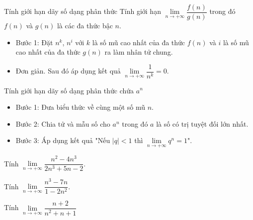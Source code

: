 \begin{dang}{Tính giới hạn dãy số dạng phân thức}
	Tính giới hạn	$\lim \limits_{n \to +\infty}\dfrac{f\left(n\right)}{g\left(n\right)}$ trong đó $f\left(n\right)$ và $g\left(n\right)$ là các đa thức bậc $n$.\\
	\begin{itemize}
		\item Bước 1: Đặt $n^k$, $n^i$  với $k$ là số mũ cao nhất của đa thức $f\left(n\right)$ và $i$ là số mũ cao nhất của đa thức $g\left(n\right)$ ra làm nhân tử chung.
		\item Đơn giản. Sau đó áp dụng kết quả 	$\lim \limits_{n \to +\infty}\dfrac{1}{n^k}=0$.
	\end{itemize}
\end{dang}
\begin{dang}{Tính giới hạn dãy số dạng phân thức chứa $a^n$}
	\begin{itemize}
		\item Bước 1: Đưa biểu thức về cùng một số mũ $n$.
		\item Bước 2: Chia tử và mẫu số cho $a^n$ trong đó $a$ là số có trị tuyệt đối lớn nhất.
		\item Bước 3: Áp dụng kết quả "Nếu $|q| <1$ thì $\lim \limits_{n \to +\infty}q^n =1$".
	\end{itemize}
\end{dang}
\begin{vd}%
	Tính $\lim \limits_{n \to +\infty}\dfrac{{{n}^2}-4{{n}^3}}{2{{n}^3}+5n-2}$.
\end{vd}
\begin{vd}%
	Tính $\lim \limits_{n \to +\infty}\dfrac{{{n}^3}-7n}{1-2{{n}^2}}$.
\end{vd}
\begin{vd}%
	Tính $\lim \limits_{n \to +\infty}\dfrac{n+2}{{{n}^2}+n+1}$
\end{vd}
